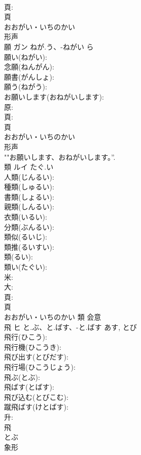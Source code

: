 \documentclass[8pt]{extreport}
\begin{document}
\begin{CJK}{UTF8}{min}
\\	頁: 
\\	頁	
\\	おおがい・いちのかい	
\\	形声 
\\	願	ガン	ねが.う、-ねがい	ら	
\\	願い(ねがい): 
\\	念願(ねんがん): 
\\	願書(がんしょ): 
\\	願う(ねがう): 
\\	お願いします(おねがいします): 
\\	原: 
\\	頁: 
\\	頁	
\\	おおがい・いちのかい	
\\	形声 
\\	""お願いします、おねがいします。”.
\\	類	ルイ	たぐ.い		
\\	人類(じんるい): 
\\	種類(しゅるい): 
\\	書類(しょるい): 
\\	親類(しんるい): 
\\	衣類(いるい): 
\\	分類(ぶんるい): 
\\	類似(るいじ): 
\\	類推(るいすい): 
\\	類(るい): 
\\	類い(たぐい): 
\\	米: 
\\	大: 
\\	頁: 
\\	頁	
\\	おおがい・いちのかい	類	会意 
\\	飛	ヒ	と.ぶ、と.ばす、-と.ばす	あす, とび	
\\	飛行(ひこう): 
\\	飛行機(ひこうき): 
\\	飛び出す(とびだす): 
\\	飛行場(ひこうじょう): 
\\	飛ぶ(とぶ): 
\\	飛ばす(とばす): 
\\	飛び込む(とびこむ): 
\\	蹴飛ばす(けとばす): 
\\	升: 
\\	飛	
\\	とぶ	
\\	象形 

\end{CJK}
\end{document}

